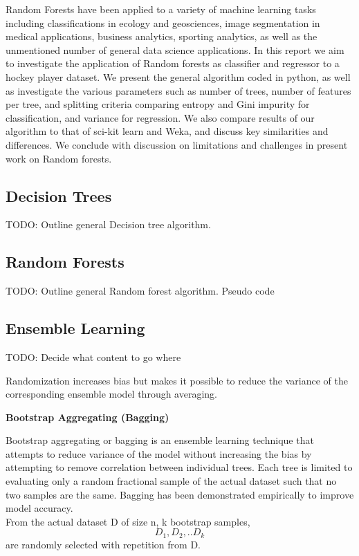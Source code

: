 \documentclass{article} %
\begin{document}
Random Forests have been applied to a variety of machine learning tasks including classifications in ecology and geosciences, image segmentation in medical applications, business analytics, sporting analytics, as well as the unmentioned number of general data science applications. \cite{Cutler2007, Harris2015, Luo2017, Ghatasheh2014, Lock2014} In this report we aim to investigate the application of Random forests as classifier and regressor to a hockey player dataset. We present the general algorithm coded in python, as well as investigate the various parameters such as number of trees, number of features per tree, and splitting criteria comparing entropy and Gini impurity for classification, and variance for regression. We also compare results of our algorithm to that of sci-kit learn and Weka, and discuss key similarities and differences. We conclude with discussion on limitations and challenges in present work on Random forests.

\subsection{Decision Trees}
TODO: Outline general Decision tree algorithm.

\subsection{Random Forests}
TODO: Outline general Random forest algorithm. Pseudo code

\subsection{Ensemble Learning}
TODO: Decide what content to go where

Randomization increases bias but makes it possible to reduce the variance of the corresponding ensemble model through averaging. \cite{formann-roe_2012}

\textbf{Bootstrap Aggregating (Bagging)}

Bootstrap aggregating or bagging is an ensemble learning technique that attempts to reduce variance of the model without increasing the bias by attempting to remove correlation between individual trees. Each tree is limited to evaluating only a random fractional sample of the actual dataset such that no two samples are the same. Bagging has been demonstrated empirically to improve model accuracy. \cite{Aslam07}\\

From the actual dataset D of size n, k bootstrap samples, \[ D_1,D_2,..D_k  \] are randomly selected with repetition from D.
\end{document}
